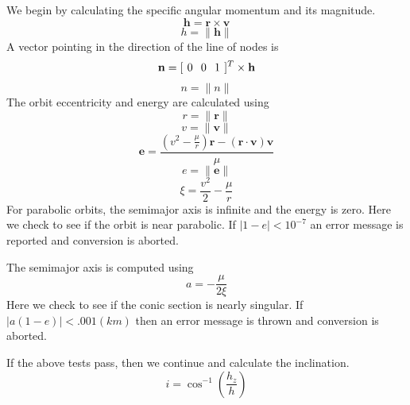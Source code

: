 We begin by calculating the specific angular momentum and its
magnitude.
%
\begin{equation}
     \mathbf{h} = \mathbf{r} \times \mathbf{v}
\end{equation}
%
\begin{equation}
     h = \|\mathbf{h} \|
\end{equation}
%
A vector pointing in the direction of the line of nodes is
%
\begin{equation}
     \mathbf{n} = [ \hspace{0.05 in} 0 \hspace{0.1 in} 0 \hspace{0.1 in} 1 \hspace{0.05
     in}]^T \times \mathbf{h}
\end{equation}
%
\begin{equation}
     n = \| n\|
\end{equation}
%
The orbit eccentricity and energy are calculated using
%
\begin{equation}
    r = \| \mathbf{r} \|
\end{equation}
%
\begin{equation}
    v = \| \mathbf{v} \|
\end{equation}
%
\begin{equation}
     \mathbf{e} = \displaystyle\frac{(v^2 - \displaystyle\frac{\mu}{r} )\mathbf{r} - (\mathbf{r}\cdot\mathbf{v}  )\mathbf{v}}{\mu}
\end{equation}
%
\begin{equation}
     e = \| \mathbf{e} \|
\end{equation}
%
\begin{equation}
     \xi = \frac{v^2}{2} - \frac{\mu}{r}
\end{equation}
%
For parabolic orbits, the semimajor axis is infinite
and the energy is zero. Here we check to see if the orbit is near
parabolic.  If $|1 - e| < 10^{-7}$ an error message is reported
and conversion is aborted.

The semimajor axis is computed using
%
\begin{equation}
     a = -\frac{\mu}{2\xi}
\end{equation}
%
Here we check to see if the conic section is nearly singular.
If $|a(1-e)| < .001 (km)$ then an error message is thrown and conversion is aborted.

If the above tests pass, then we continue and calculate the inclination.
%
\begin{equation}
     i = \cos^{-1}\left(\frac{h_z}{h}\right)
\end{equation}

